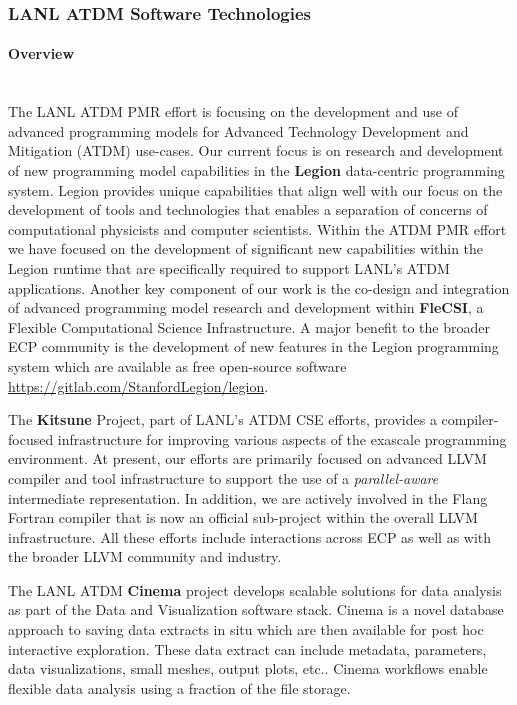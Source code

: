 \subsubsection{ LANL ATDM Software Technologies}

\paragraph{Overview} \leavevmode \\

The LANL ATDM PMR effort is focusing on the development and use of
advanced programming models for Advanced Technology Development and
Mitigation (ATDM) use-cases. Our current focus is on research and development
of new programming model capabilities in the \textbf{Legion} data-centric
programming system. Legion provides unique capabilities that align
well with our focus on the development of tools and technologies that
enables a separation of concerns of computational physicists and
computer scientists. Within the ATDM PMR effort we have focused on the
development of significant new capabilities within the Legion runtime
that are specifically required to support LANL's ATDM
applications. Another key component of our work is the co-design and
integration of advanced programming model research and development
within \textbf{FleCSI}, a Flexible Computational Science Infrastructure. A
major benefit to the broader ECP community is the development of new 
features in the Legion programming system which are available as free
open-source software \url{https://gitlab.com/StanfordLegion/legion}.  

The \textbf{Kitsune} Project, part of LANL's ATDM CSE efforts, provides a
compiler-focused infrastructure for improving various aspects of the
exascale programming environment.  At present, our efforts are primarily
focused on advanced LLVM compiler and tool infrastructure to support the
use of a \emph{parallel-aware} intermediate representation.  In
addition, we are actively involved in the Flang Fortran compiler that
is now an official sub-project within the overall LLVM infrastructure.
All these efforts include interactions across ECP as well as
with the broader LLVM community and industry.  

The LANL ATDM \textbf{Cinema} project  develops scalable 
solutions for data analysis as part of the Data and Visualization software stack.  Cinema is a novel database approach to saving data extracts in situ which are then available for post hoc interactive exploration.  These data extract can include metadata, parameters, data visualizations, small meshes, output plots, etc..  Cinema workflows enable flexible data analysis using a fraction of the file storage. 

